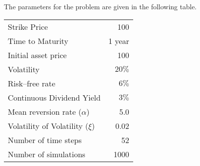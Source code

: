 \documentclass[11pt]{article}
\begin{document}
\bigskip
\bigskip
The parameters for the problem are given in the following table.

\bigskip
\begin{table}[h!]
\centering
\begin{tabular}{lr}
\hline
\hline
Strike Price                   &    100    \\ 
Time to Maturity               &    1 year \\
Initial asset price            &    100    \\
Volatility                     &    $20\%$ \\
Risk--free rate                &    $6\%$  \\
Continuous Dividend Yield      &    $3\%$  \\
Mean reversion rate ($\alpha$) &    5.0    \\
Volatility of Volatility ($\xi$) &  0.02   \\
Number of time steps           &    52     \\
Number of simulations          &    1000   \\                                                              
\hline
\hline
\end{tabular}
\end{table}
\end{document}
